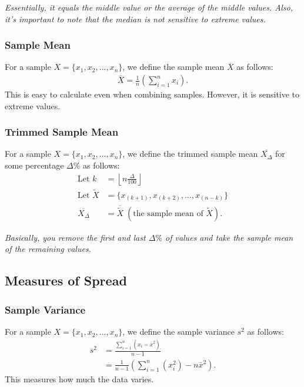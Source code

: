 \documentclass[a4paper, 12pt, twoside]{article}
\def\lf{\left\lfloor}
\def\rf{\right\rfloor}
\begin{document}
\textit{Essentially, it equals the middle value or the average of the
    middle values. Also, it's important to note that the median is not
    sensitive to extreme values.}

\subsubsection{Sample Mean}

For a sample $X = \{x_1, x_2, \ldots, x_n\}$, we define the sample
mean $\overline{X}$ as follows:
\begin{align*}
    \overline{X} = \frac{1}{n}\left(\sum_{i = 1}^{n} x_i \right).
\end{align*}
This is easy to calculate even when combining samples. However, it is
sensitive to extreme values.

\subsubsection{Trimmed Sample Mean}

For a sample $X = \{x_1, x_2, \ldots, x_n\}$, we define the trimmed
sample mean $\overline{X_\Delta}$ for some percentage $\Delta\%$ as follows:
\begin{align*}
    \text{Let } k         & = \lf n \frac{\Delta}{100} \rf \\
    \text{Let } \tilde{X} & = \{x_{(k + 1)}, x_{(k + 2)},
    \ldots, x_{(n - k)}\}                                  \\
    \overline{X_\Delta}   & = \overline{\tilde{X}} \;
    (\text{the sample mean of } \tilde{X}).
\end{align*}

\textit{Basically, you remove the first and last $\Delta\%$
    of values and take the sample mean of the remaining values.}

\subsection{Measures of Spread}

\subsubsection{Sample Variance}

For a sample $X = \{x_1, x_2, \ldots, x_n\}$, we define the sample
variance $s^2$ as follows:
\begin{align*}
    s^2 & = \frac{\sum_{i = 1}^n (x_i - \bar{x}^2)}{n - 1}                  \\
        & = \frac{1}{n-1}\left(\sum_{i = 1}^{n}(x_i^2) - n\bar{x}^2\right).
\end{align*}
This measures how much the data varies.
\end{document}
